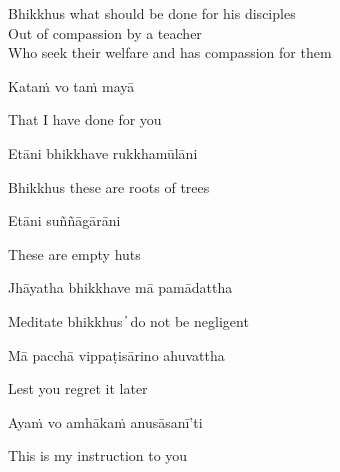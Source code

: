 \begin{english}
  Bhikkhus what should be done for his disciples\\
  Out of compassion by a teacher\\
  Who seek their welfare and has compassion for them
\end{english}

\begin{twochants}
  Kataṁ vo taṁ mayā
\end{twochants}

\begin{english}
  That I have done for you
\end{english}

\begin{twochants}
  Etāni bhikkhave rukkhamūlāni
\end{twochants}

\begin{english}
  Bhikkhus these are roots of trees
\end{english}

\begin{twochants}
  Etāni suññāgārāni
\end{twochants}

\begin{english}
  These are empty huts
\end{english}

\begin{twochants}
  Jhāyatha bhikkhave mā pamādattha
\end{twochants}

\begin{english}
  Meditate bhikkhus  ̓  do not be negligent
\end{english}

\begin{twochants}
  Mā pacchā vippaṭisārino ahuvattha
\end{twochants}

\begin{english}
  Lest you regret it later
\end{english}

\begin{twochants}
  Ayaṁ vo amhākaṁ anusāsanī’ti
\end{twochants}

\begin{english}
  This is my instruction to you
\end{english}


